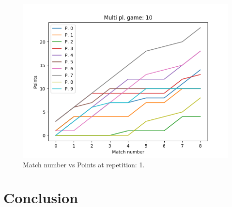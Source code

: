 \documentclass[journal,a4paper,10pt,twoside]{IEEEtran}
\begin{document}
\begin{figure}
    \centering
    \includegraphics[width=1\columnwidth]{../img_v1/cidpmp-scores-10.png}
    \caption{Match number vs Points at repetition: 1.}
    \label{fig:cmpipd1}
\end{figure}



\section{Conclusion} \label{Conclusion}

%
%
\end{document}
